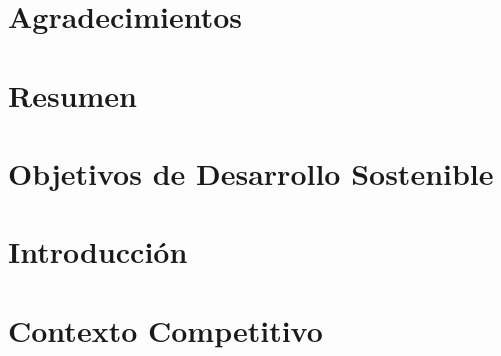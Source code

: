 \documentclass[a4paper, 11pt, oneside]{memoir}
\title{\izenburua}
\author{\egilea}
\date{\data}
\begin{document}

% 


\cleardoublepage
\frontmatter


\chapter*{Agradecimientos}

\cleardoublepage


\chapter*{Resumen}

\cleardoublepage


\chapter*{Objetivos de Desarrollo Sostenible}

\cleardoublepage


\tableofcontents
\clearpage
\listoffigures
\clearpage
\listoftables
\clearpage
\listofalgorithms
{}


\cleardoublepage
\mainmatter
\pagestyle{ruled}

\nocite{ehuagenda2030}

\chapter{Introducción} \label{ch:introduccion}

\cleardoublepage

\chapter{Contexto Competitivo} \label{ch:contextoCompetitivo}

\cleardoublepage
\end{document}
